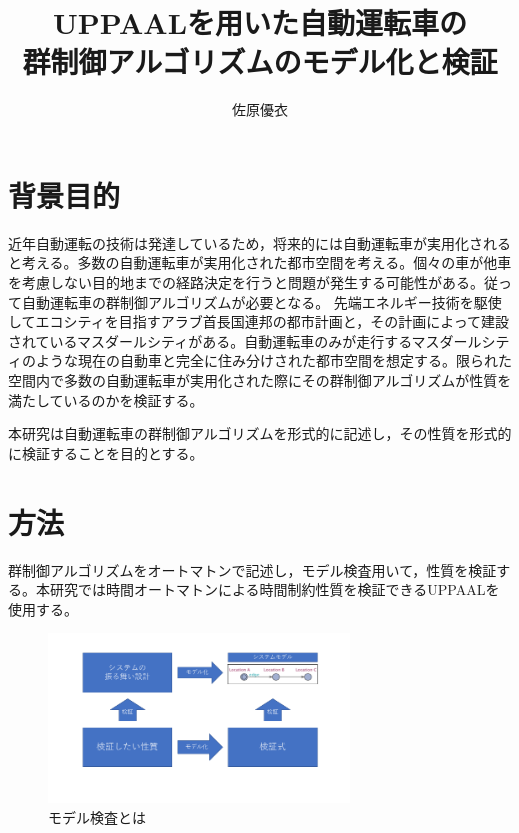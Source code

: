 \documentclass[twocolumn]{jsarticle}
\begin{document}
\title{UPPAALを用いた自動運転車の\\群制御アルゴリズムのモデル化と検証}
\author{佐原優衣}
\maketitle

\section*{背景目的}
近年自動運転の技術は発達しているため，将来的には自動運転車が実用化されると考える。多数の自動運転車が実用化された都市空間を考える。個々の車が他車を考慮しない目的地までの経路決定を行うと問題が発生する可能性がある。従って自動運転車の群制御アルゴリズムが必要となる。
先端エネルギー技術を駆使してエコシティを目指すアラブ首長国連邦の都市計画と，その計画によって建設されているマスダールシティがある。自動運転車のみが走行するマスダールシティのような現在の自動車と完全に住み分けされた都市空間を想定する。限られた空間内で多数の自動運転車が実用化された際にその群制御アルゴリズムが性質を満たしているのかを検証する。

本研究は自動運転車の群制御アルゴリズムを形式的に記述し，その性質を形式的に検証することを目的とする。
\section*{方法}
群制御アルゴリズムをオートマトンで記述し，モデル検査用いて，性質を検証する。本研究では時間オートマトンによる時間制約性質を検証できるUPPAALを使用する。
\begin{figure}
	\centering
	\includegraphics[width=80mm]{kensho.png}
	\caption{モデル検査とは}
\end{figure}
\end{document}
